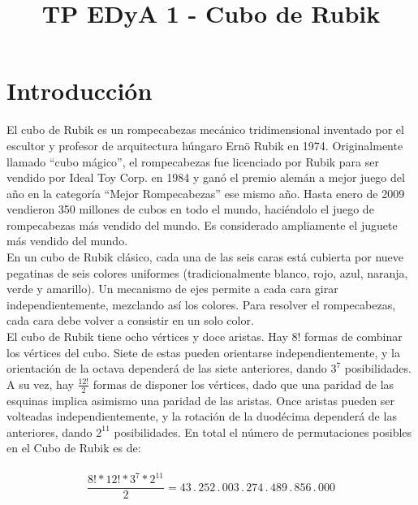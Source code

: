 \documentclass[11pt,a4paper]{article}
\begin{document}
\title{TP EDyA 1 - Cubo de Rubik}

\maketitle


\section{Introducción}

El cubo de Rubik es un rompecabezas mecánico tridimensional inventado por el escultor y profesor de arquitectura húngaro Ernö Rubik en 1974. Originalmente llamado ``cubo mágico'', el rompecabezas fue licenciado por Rubik para ser vendido por Ideal Toy Corp. en 1984 y ganó el premio alemán a mejor juego del año en la categoría ``Mejor Rompecabezas'' ese mismo año. Hasta enero de 2009 vendieron 350 millones de cubos en todo el mundo, haciéndolo el juego de rompecabezas más vendido del mundo. Es considerado ampliamente el juguete más vendido del mundo. \\

En un cubo de Rubik clásico, cada una de las seis caras está cubierta por nueve pegatinas de seis colores uniformes (tradicionalmente blanco, rojo, azul, naranja, verde y amarillo). Un mecanismo de ejes permite a cada cara girar independientemente, mezclando así los colores. Para resolver el rompecabezas, cada cara debe volver a consistir en un solo color.\\

El cubo de Rubik tiene ocho vértices y doce aristas. Hay $8!$ formas de combinar los vértices del cubo. Siete de estas pueden orientarse independientemente, y la orientación de la octava dependerá de las siete anteriores, dando  $3^7$ posibilidades. A su vez, hay $\frac{12!}{2}$ formas de disponer los vértices, dado que una paridad de las esquinas implica asimismo una paridad de las aristas. Once aristas pueden ser volteadas independientemente, y la rotación de la duodécima dependerá de las anteriores, dando $2^{11}$ posibilidades. En total el número de permutaciones posibles en el Cubo de Rubik es de:\\
\\
 $$ \frac{8!*12!*3^7*2^{11}}{2} = 43 \,.\, 252 \,.\, 003 \,.\, 274 \,.\, 489 \,.\, 856 \,.\, 000 $$ \\
 
\end{document}
